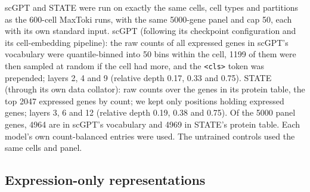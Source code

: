 \documentclass[
  11pt,
]{article}
\begin{document}
scGPT and STATE were run on exactly the same cells, cell types and
partitions as the 600-cell MaxToki runs, with the same 5000-gene panel
and cap 50, each with its own standard input. scGPT (following its
checkpoint configuration and its cell-embedding pipeline): the raw
counts of all expressed genes in scGPT's vocabulary were quantile-binned
into 50 bins within the cell, 1199 of them were then sampled at random
if the cell had more, and the \texttt{\textless{}cls\textgreater{}}
token was prepended; layers 2, 4 and 9 (relative depth 0.17, 0.33 and
0.75). STATE (through its own data collator): raw counts over the genes
in its protein table, the top 2047 expressed genes by count; we kept
only positions holding expressed genes; layers 3, 6 and 12 (relative
depth 0.19, 0.38 and 0.75). Of the 5000 panel genes, 4964 are in scGPT's
vocabulary and 4969 in STATE's protein table. Each model's own
count-balanced entries were used. The untrained controls used the same
cells and panel.

\subsection{Expression-only
representations}\label{expression-only-representations}
\end{document}
